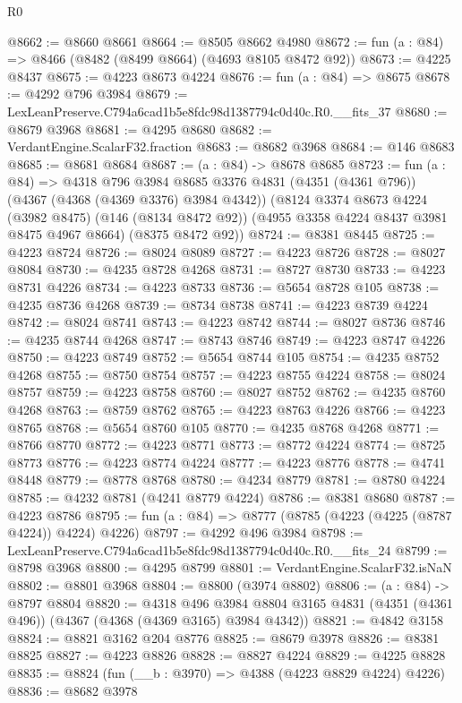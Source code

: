 \begin{lexlean}{R0}
\begin{coremodule}
@8662 := @8660 @8661
@8664 := @8505 @8662 @4980
@8672 := fun (a : @84) => @8466 (@8482 (@8499 @8664) (@4693 @8105 @8472 @92))
@8673 := @4225 @8437
@8675 := @4223 @8673 @4224
@8676 := fun (a : @84) => @8675
@8678 := @4292 @796 @3984
@8679 := LexLeanPreserve.C794a6cad1b5e8fdc98d1387794c0d40c.R0.__fits_37
@8680 := @8679 @3968
@8681 := @4295 @8680
@8682 := VerdantEngine.ScalarF32.fraction
@8683 := @8682 @3968
@8684 := @146 @8683
@8685 := @8681 @8684
@8687 := (a : @84) -> @8678 @8685
@8723 := fun (a : @84) =>
  @4318
    @796
    @3984
    @8685
    @3376
    @4831
    (@4351 (@4361 @796))
    (@4367 (@4368 (@4369 @3376) @3984 @4342))
    (@8124
      @3374
      @8673
      @4224
      (@3982 @8475)
      (@146 (@8134 @8472 @92))
      (@4955 @3358 @4224 @8437 @3981 @8475 @4967 @8664)
      (@8375 @8472 @92))
@8724 := @8381 @8445
@8725 := @4223 @8724
@8726 := @8024 @8089
@8727 := @4223 @8726
@8728 := @8027 @8084
@8730 := @4235 @8728 @4268
@8731 := @8727 @8730
@8733 := @4223 @8731 @4226
@8734 := @4223 @8733
@8736 := @5654 @8728 @105
@8738 := @4235 @8736 @4268
@8739 := @8734 @8738
@8741 := @4223 @8739 @4224
@8742 := @8024 @8741
@8743 := @4223 @8742
@8744 := @8027 @8736
@8746 := @4235 @8744 @4268
@8747 := @8743 @8746
@8749 := @4223 @8747 @4226
@8750 := @4223 @8749
@8752 := @5654 @8744 @105
@8754 := @4235 @8752 @4268
@8755 := @8750 @8754
@8757 := @4223 @8755 @4224
@8758 := @8024 @8757
@8759 := @4223 @8758
@8760 := @8027 @8752
@8762 := @4235 @8760 @4268
@8763 := @8759 @8762
@8765 := @4223 @8763 @4226
@8766 := @4223 @8765
@8768 := @5654 @8760 @105
@8770 := @4235 @8768 @4268
@8771 := @8766 @8770
@8772 := @4223 @8771
@8773 := @8772 @4224
@8774 := @8725 @8773
@8776 := @4223 @8774 @4224
@8777 := @4223 @8776
@8778 := @4741 @8448
@8779 := @8778 @8768
@8780 := @4234 @8779
@8781 := @8780 @4224
@8785 := @4232 @8781 (@4241 @8779 @4224)
@8786 := @8381 @8680
@8787 := @4223 @8786
@8795 := fun (a : @84) => @8777 (@8785 (@4223 (@4225 (@8787 @4224)) @4224) @4226)
@8797 := @4292 @496 @3984
@8798 := LexLeanPreserve.C794a6cad1b5e8fdc98d1387794c0d40c.R0.__fits_24
@8799 := @8798 @3968
@8800 := @4295 @8799
@8801 := VerdantEngine.ScalarF32.isNaN
@8802 := @8801 @3968
@8804 := @8800 (@3974 @8802)
@8806 := (a : @84) -> @8797 @8804
@8820 := @4318
    @496
    @3984
    @8804
    @3165
    @4831
    (@4351 (@4361 @496))
    (@4367 (@4368 (@4369 @3165) @3984 @4342))
@8821 := @4842 @3158
@8824 := @8821 @3162 @204 @8776
@8825 := @8679 @3978
@8826 := @8381 @8825
@8827 := @4223 @8826
@8828 := @8827 @4224
@8829 := @4225 @8828
@8835 := @8824 (fun (__b : @3970) => @4388 (@4223 @8829 @4224) @4226)
@8836 := @8682 @3978

\end{coremodule}
\end{lexlean}
